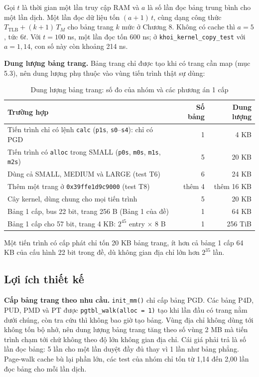 \documentclass[12pt,a4paper]{article}
\begin{document}
	Gọi \(t\) là thời gian một lần truy cập RAM và \(a\) là số lần đọc bảng trung bình cho một lần dịch. Một lần đọc dữ liệu tốn \((a+1)\,t\), cùng dạng công thức \(T_{\text{TLB}} + (k+1)\,T_M\) cho bảng trang \(k\) mức ở Chương 8. Không có cache thì \(a = 5\), tức \(6t\). Với \(t = 100\) ns, một lần đọc tốn 600 ns; ở \texttt{khoi\_kernel\_copy\_test} với \(a = 1{,}14\), con số này còn khoảng 214 ns.

	\medskip
	\noindent\textbf{Dung lượng bảng trang.} Bảng trang chỉ được tạo khi có trang cần map (mục 5.3), nên dung lượng phụ thuộc vào vùng tiến trình thật sự dùng:
	\begin{table}[H]
	\centering\small
	\begin{tabularx}{\linewidth}{Xrr}
	\toprule
	\textbf{Trường hợp} & \textbf{Số bảng} & \textbf{Dung lượng} \\
	\midrule
	Tiến trình chỉ có lệnh \texttt{calc} (\texttt{p1s}, \texttt{s0}--\texttt{s4}): chỉ có PGD & 1 & 4 KB \\
	Tiến trình có \texttt{alloc} trong SMALL (\texttt{p0s}, \texttt{m0s}, \texttt{m1s}, \texttt{m2s}) & 5 & 20 KB \\
	Dùng cả SMALL, MEDIUM và LARGE (test T6) & 6 & 24 KB \\
	Thêm một trang ở \texttt{0x39ffe1d9c9000} (test T8) & thêm 4 & thêm 16 KB \\
	Cây kernel, dùng chung cho mọi tiến trình & 5 & 20 KB \\
	\midrule
	Bảng 1 cấp, bus 22 bit, trang 256 B (Bảng 1 của đề) & 1 & 64 KB \\
	Bảng 1 cấp cho 57 bit, trang 4 KB: \(2^{45}\) entry \(\times\) 8 B & 1 & 256 TiB \\
	\bottomrule
	\end{tabularx}
	\caption{Dung lượng bảng trang: số đo của nhóm và các phương án 1 cấp}
	\label{tab:nhan-size}
	\end{table}
	Một tiến trình có cấp phát chỉ tốn 20 KB bảng trang, ít hơn cả bảng 1 cấp 64 KB của cấu hình 22 bit trong đề, dù không gian địa chỉ lớn hơn \(2^{35}\) lần.

	\subsection{Lợi ích thiết kế}
	\noindent\textbf{Cấp bảng trang theo nhu cầu.} \texttt{init\_mm()} chỉ cấp bảng PGD. Các bảng P4D, PUD, PMD và PT được \texttt{pgtbl\_walk(alloc = 1)} tạo khi lần đầu có trang nằm dưới chúng, còn tra cứu thì không bao giờ tạo bảng. Vùng địa chỉ không dùng tới không tốn bộ nhớ, nên dung lượng bảng trang tăng theo số vùng 2 MB mà tiến trình chạm tới chứ không theo độ lớn không gian địa chỉ. Cái giá phải trả là số lần đọc bảng: 5 lần cho một lần duyệt đầy đủ thay vì 1 lần như bảng phẳng. Page-walk cache bù lại phần lớn, các test của nhóm chỉ tốn từ 1,14 đến 2,00 lần đọc bảng cho mỗi lần dịch.
\end{document}
